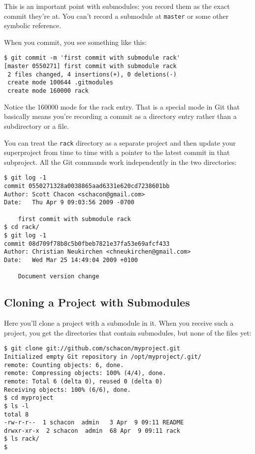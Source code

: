 \documentclass[a4paper]{book}
\begin{document}
This is an important point with submodules: you record them as the exact commit they're at. You can't record a submodule at \texttt{master} or some other symbolic reference.

When you commit, you see something like this:

\begin{shaded}\begin{verbatim}
$ git commit -m 'first commit with submodule rack'
[master 0550271] first commit with submodule rack
 2 files changed, 4 insertions(+), 0 deletions(-)
 create mode 100644 .gitmodules
 create mode 160000 rack
\end{verbatim}\end{shaded}

Notice the 160000 mode for the rack entry. That is a special mode in Git that basically means you're recording a commit as a directory entry rather than a subdirectory or a file.

You can treat the \texttt{rack} directory as a separate project and then update your superproject from time to time with a pointer to the latest commit in that subproject. All the Git commands work independently in the two directories:

\begin{shaded}\begin{verbatim}
$ git log -1
commit 0550271328a0038865aad6331e620cd7238601bb
Author: Scott Chacon <schacon@gmail.com>
Date:   Thu Apr 9 09:03:56 2009 -0700

    first commit with submodule rack
$ cd rack/
$ git log -1
commit 08d709f78b8c5b0fbeb7821e37fa53e69afcf433
Author: Christian Neukirchen <chneukirchen@gmail.com>
Date:   Wed Mar 25 14:49:04 2009 +0100

    Document version change
\end{verbatim}\end{shaded}

\subsection{Cloning a Project with Submodules}

Here you'll clone a project with a submodule in it. When you receive such a project, you get the directories that contain submodules, but none of the files yet:

\begin{shaded}\begin{verbatim}
$ git clone git://github.com/schacon/myproject.git
Initialized empty Git repository in /opt/myproject/.git/
remote: Counting objects: 6, done.
remote: Compressing objects: 100% (4/4), done.
remote: Total 6 (delta 0), reused 0 (delta 0)
Receiving objects: 100% (6/6), done.
$ cd myproject
$ ls -l
total 8
-rw-r-r--  1 schacon  admin   3 Apr  9 09:11 README
drwxr-xr-x  2 schacon  admin  68 Apr  9 09:11 rack
$ ls rack/
$
\end{verbatim}\end{shaded}
\end{document}
